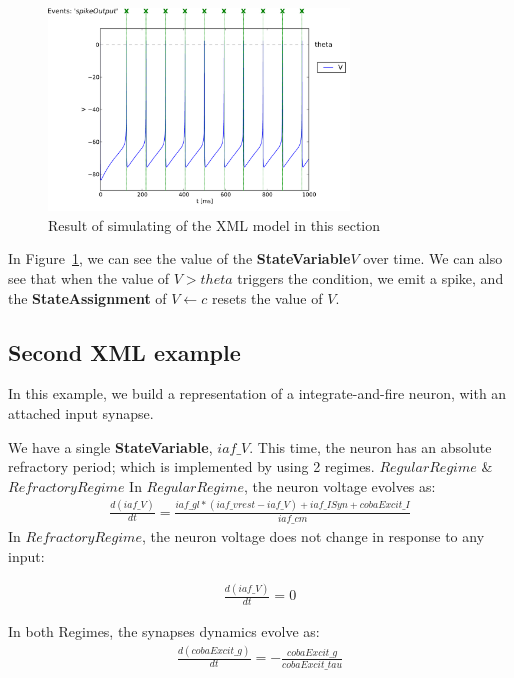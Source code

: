 \documentclass{article}
\newcommand{\StateVariable}{{\bf{StateVariable}}\xspace}
\newcommand{\StateAssignment}{{\bf{StateAssignment}}\xspace}
\begin{document}
\begin{figure}[htb!]
\center
\includegraphics[width=8cm]{figures/example_IzVoltageWave.pdf}
\protect\caption{Result of simulating of the XML model in
this section}
\label{fig:Ex1_Output}
\end{figure}

In Figure~\ref{fig:Ex1_Output}, we can see the value of the \StateVariable $V$
over time. We can also see that when the value of $V>theta$ triggers the
condition, we emit a spike, and the \StateAssignment of $V \leftarrow c$ resets
the value of $V$.

\newpage
\subsection{Second XML example}

In this example, we build a representation of a integrate-and-fire neuron, with
an attached input synapse.

We have a single \StateVariable, $iaf\_V$.
This time, the neuron has an absolute refractory period; which is implemented by using 2 regimes. $RegularRegime$ \& $RefractoryRegime$
In $RegularRegime$, the neuron voltage evolves as:
\begin{eqnarray}
\frac{d(iaf\_V)}{dt} = \frac{ iaf\_gl*( iaf\_vrest - iaf\_V ) + iaf\_ISyn+cobaExcit\_I} {iaf\_cm}
\end{eqnarray}
In $RefractoryRegime$, the neuron voltage does not change in response to any input:

\begin{eqnarray}
\frac{d(iaf\_V)}{dt} = 0
\end{eqnarray}

In both Regimes, the synapses dynamics evolve as:
\begin{eqnarray}
\frac{d(cobaExcit\_g)}{dt} = - \frac{cobaExcit\_g}{cobaExcit\_tau}
\end{eqnarray}
\end{document}
